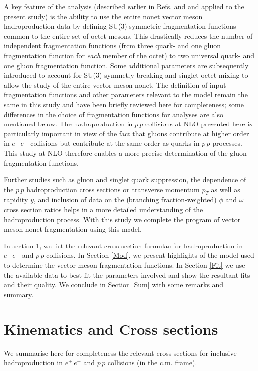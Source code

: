 \documentclass{ws-ijmpa}
\begin{document}
A key feature of the analysis (described earlier in Refs.\cite{Savilo}
and \cite{Savinlo} and applied to the present study) is the ability
to use the entire nonet vector meson hadroproduction data by defining
SU(3)-symmetric fragmentation functions common to the entire set of octet
mesons. This drastically reduces the number of independent fragmentation
functions (from three quark- and one gluon fragmentation function for
{\em each} member of the octet) to two universal quark- and one gluon
fragmentation function. Some additional parameters are subsequently
introduced to account for SU(3) symmetry breaking and singlet-octet
mixing to allow the study of the entire vector meson nonet. The definition of
input fragmentation functions and other parameters relevant to the
model\cite{Savinlo} remain the same in this study and have been briefly
reviewed here for completeness; some differences in the choice of
fragmentation functions for analyses are also mentioned below. The
hadroproduction in $p\,p$ collisions at NLO presented here is particularly
important in view of the fact that gluons contribute at higher order in
$e^+\,e^-$ collisions but contribute at the same order as quarks in $p\,p$
processes. This study at NLO therefore enables a more precise determination of
the gluon fragmentation functions.

Further studies such as gluon and singlet quark suppression, the
dependence of the $p\,p$ hadroproduction cross sections on transverse
momentum $p_T$ as well as rapidity $y$, and inclusion of data on
the (branching fraction-weighted) $\phi$ and $\omega$ cross section
ratios helps in a more detailed understanding of the hadroproduction
process. With this study we complete the program of vector meson nonet
fragmentation using this model.

In section \ref{Kin}, we list the relevant cross-section formulae for
hadroproduction in $e^+\,e^-$ and $p\,p$ collisions. In Section \ref{Mod}, 
we
present highlights of the model used to determine the vector meson
fragmentation functions. In Section \ref{Fit} we use the available data to
best-fit the parameters involved and show the resultant fits and their
quality. We conclude in Section \ref{Sum} with some remarks and summary.

\section{Kinematics and Cross sections}
\label{Kin}
We summarise here for completeness the relevant cross-sections for
inclusive hadroproduction in $e^+\,e^-$ and $p\,p$ collisions (in the
c.m. frame).
\end{document}
